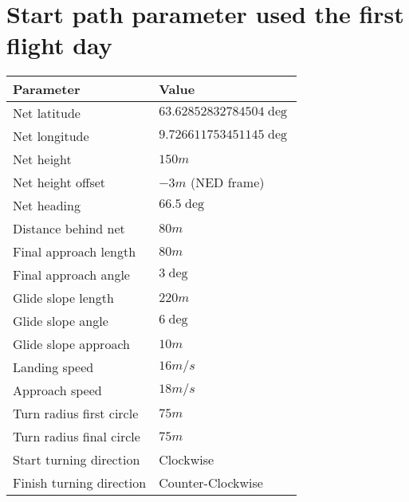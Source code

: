 \section{Start path parameter used the first flight day}\label{AP:SpecDay1}
\begin{table}
\centering
\begin{tabular}{| p{4cm} | p{4cm} |}
\hline
\textbf{Parameter}			& \textbf{Value}			\\ \hline
Net latitude				& $63.62852832784504 \deg$ 	\\ \hline
Net longitude				& $9.726611753451145 \deg$ 	\\ \hline
Net height					& $150 m$					\\ \hline
Net height offset			& $-3 m$ (NED frame)		\\ \hline
Net heading					& $66.5 \deg$				\\ \hline
Distance behind net			& $80 m$					\\ \hline
Final approach length		& $80 m$					\\ \hline
Final approach angle		& $3 \deg$					\\ \hline
Glide slope length			& $220 m $					\\ \hline
Glide slope angle			& $6 \deg$					\\ \hline
Glide slope approach		& $10 m$					\\ \hline
Landing speed				& $16 m/s$					\\ \hline
Approach speed				& $18 m/s$					\\ \hline
Turn radius first circle	& $75 m$					\\ \hline
Turn radius final circle	& $75 m$					\\ \hline
Start turning direction		& Clockwise					\\ \hline
Finish turning direction	& Counter-Clockwise			\\ \hline
\end{tabular}
\end{table}
